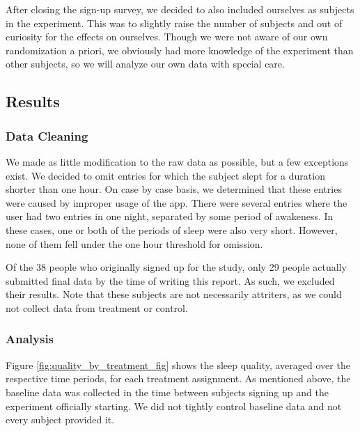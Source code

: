 \documentclass[]{article}
\begin{document}
After closing the sign-up survey, we decided to also included ourselves
as subjects in the experiment. This was to slightly raise the number of
subjects and out of curiosity for the effects on ourselves. Though we
were not aware of our own randomization a priori, we obviously had more
knowledge of the experiment than other subjects, so we will analyze our
own data with special care.

\hypertarget{results}{%
\subsection{Results}\label{results}}

\hypertarget{data-cleaning}{%
\subsubsection{Data Cleaning}\label{data-cleaning}}

We made as little modification to the raw data as possible, but a few
exceptions exist. We decided to omit entries for which the subject slept
for a duration shorter than one hour. On case by case basis, we
determined that these entries were caused by improper usage of the app.
There were several entries where the user had two entries in one night,
separated by some period of awakeness. In these cases, one or both of
the periods of sleep were also very short. However, none of them fell
under the one hour threshold for omission.

Of the 38 people who originally signed up for the study, only 29 people
actually submitted final data by the time of writing this report. As
such, we excluded their results. Note that these subjects are not
necessarily attriters, as we could not collect data from treatment or
control.

\hypertarget{analysis}{%
\subsubsection{Analysis}\label{analysis}}

Figure \ref{fig:quality_by_treatment_fig} shows the sleep quality,
averaged over the respective time periods, for each treatment
assignment. As mentioned above, the baseline data was collected in the
time between subjects signing up and the experiment officially starting.
We did not tightly control baseline data and not every subject provided
it.
\end{document}
